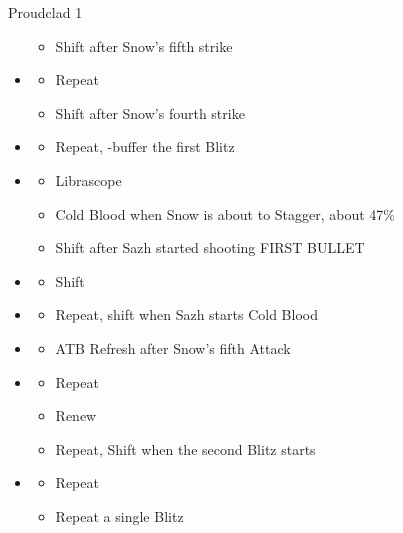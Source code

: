 \begin{paracol}{2}
\begin{battle}{Proudclad 1}
\begin{itemize}
\begin{itemize}
        \item Shift after Snow's fifth strike
    \end{itemize}
    \item \sixth
    \begin{itemize}
        \item Repeat
        \item Shift after Snow's fourth strike
    \end{itemize}
    \item \first
    \begin{itemize}
        \item Repeat, \rav-buffer the first Blitz
    \end{itemize}
    \item \fifth
    \begin{itemize}
        \item Librascope
        \item Cold Blood when Snow is about to Stagger, about 47\%
        \item Shift after Sazh started shooting FIRST BULLET
    \end{itemize}
    \item \sixth
    \begin{itemize}
        \item Shift
    \end{itemize}
    \item \fifth
    \begin{itemize}
        \item Repeat, shift when Sazh starts Cold Blood
    \end{itemize}
    \item \first
    \begin{itemize}
        \item ATB Refresh after Snow's fifth Attack
    \end{itemize}
    \item \second
    \begin{itemize}
        \item Repeat
        \item Renew
        \item Repeat, Shift when the second Blitz starts
    \end{itemize}
    \item \first
    \begin{itemize}
        \item Repeat
        \item Repeat a single Blitz

\end{itemize}
\end{itemize}
\end{battle}
\end{paracol}
